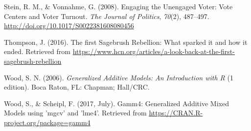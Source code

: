 \documentclass[12pt,twoside]{reedthesis}
\begin{document}
  \hypertarget{ref-stein_engaging_2008}{}
  Stein, R. M., \& Vonnahme, G. (2008). Engaging the Unengaged Voter: Vote
  Centers and Voter Turnout. \emph{The Journal of Politics}, \emph{70}(2),
  487--497. \url{http://doi.org/10.1017/S0022381608080456}
  
  \hypertarget{ref-thompson_first_2016}{}
  Thompson, J. (2016). The first Sagebrush Rebellion: What sparked it and
  how it ended. Retrieved from
  \url{https://www.hcn.org/articles/a-look-back-at-the-first-sagebrush-rebellion}
  
  \hypertarget{ref-wood_generalized_2006}{}
  Wood, S. N. (2006). \emph{Generalized Additive Models: An Introduction
  with R} (1 edition). Boca Raton, FL: Chapman; Hall/CRC.
  
  \hypertarget{ref-wood_gamm4:_2017}{}
  Wood, S., \& Scheipl, F. (2017, July). Gamm4: Generalized Additive Mixed
  Models using 'mgcv' and 'lme4'. Retrieved from
  \url{https://CRAN.R-project.org/package=gamm4}


\end{document}
